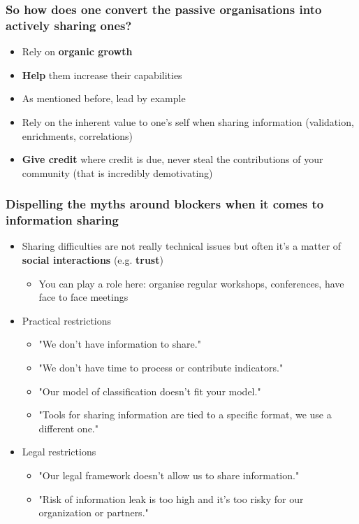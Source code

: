 \begin{frame}
	\frametitle{So how does one convert the passive organisations into actively sharing ones?}
	\begin{itemize}
		\item Rely on \textbf{organic growth}
		\item \textbf{Help} them increase their capabilities
		\item As mentioned before, lead by example
		\item Rely on the inherent value to one's self when sharing information (validation, enrichments, correlations)
		\item \textbf{Give credit} where credit is due, never steal the contributions of your community (that is incredibly demotivating)
	\end{itemize}
\end{frame}

\begin{frame}
	\frametitle{Dispelling the myths around blockers when it comes to information sharing}
	\begin{itemize}
		\item Sharing difficulties are not really technical issues but often it's a matter of \textbf{social interactions} (e.g. \textbf{trust})
		\begin{itemize}
			\item You can play a role here: organise regular workshops, conferences, have face to face meetings
		\end{itemize}
		\item Practical restrictions
		\begin{itemize}
			\item "We don't have information to share."
			\item "We don't have time to process or contribute indicators."
			\item "Our model of classification doesn't fit your model."
			\item "Tools for sharing information are tied to a specific format, we use a different one."
		\end{itemize}
		\item Legal restrictions
		\begin{itemize}
			\item "Our legal framework doesn't allow us to share information."
			\item "Risk of information leak is too high and it's too risky for our organization or partners."
		\end{itemize}
	\end{itemize}
\end{frame}

